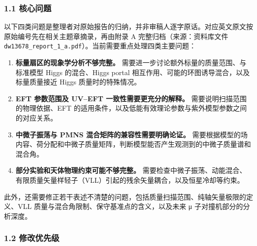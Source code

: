 \documentclass[
]{article}
\providecommand{\tightlist}{%
  \setlength{\itemsep}{0pt}\setlength{\parskip}{0pt}}
\begin{document}
\subsubsection{1.1 核心问题}\label{ux6838ux5fc3ux95eeux9898}

以下四类问题是整理者对原始报告的归纳，并非审稿人逐字原话。对应英文原文按原始编号先在相关主题章摘录，再由附录
A 完整归档（来源：资料库文件
\texttt{dw13678\_report\_1\_a.pdf}）。当前需要重点处理四类主要问题：

\begin{enumerate}
\def\labelenumi{\arabic{enumi}.}
\tightlist
\item
  \textbf{标量扇区的现象学分析不够完整。}
  需要进一步讨论额外标量的质量范围、与标准模型 Higgs 的混合、Higgs
  portal 相互作用、可能的环图诱导混合，以及标量质量接近 Higgs
  质量时的特殊情况。
\item
  \textbf{EFT 参数范围及 UV--EFT 一致性需要更充分的解释。}
  需要说明扫描范围的物理依据、EFT
  的适用条件，以及低能有效理论参数与紫外模型参数之间的对应关系。
\item
  \textbf{中微子振荡与 PMNS 混合矩阵的兼容性需要明确论证。}
  需要根据模型的场内容、荷分配和中微子质量矩阵，判断模型能否产生观测到的中微子质量谱和混合角。
\item
  \textbf{部分实验和天体物理约束可能不够完整。}
  需要检查中微子振荡、动能混合、有限质量矢量样轻子（VLL）引起的残余矢量耦合，以及恒星冷却等约束。
\end{enumerate}

此外，还需要修正若干表述不清楚的问题，包括质量扫描范围、纯轴矢量极限的定义、VLL
质量与混合角限制、保守基准点的含义，以及未来 μ 子对撞机部分的分析深度。

\subsubsection{1.2 修改优先级}\label{ux4feeux6539ux4f18ux5148ux7ea7}
\end{document}
